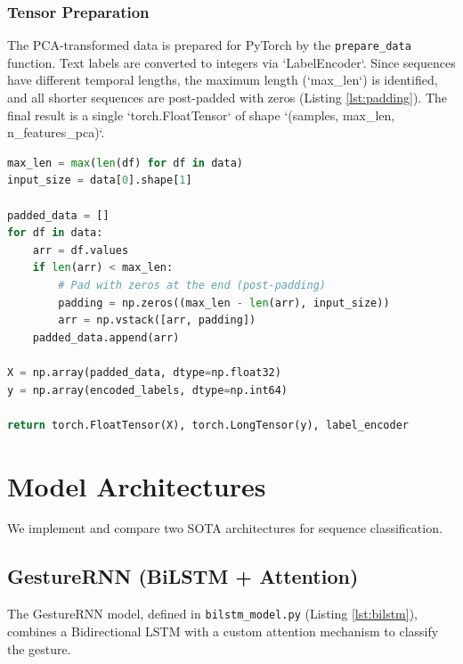 \documentclass[]{IEEEphot}
\begin{document}
\subsubsection{Tensor Preparation}
The PCA-transformed data is prepared for PyTorch by the \texttt{prepare\_data} function. Text labels are converted to integers via `LabelEncoder`. Since sequences have different temporal lengths, the maximum length (`max\_len`) is identified, and all shorter sequences are post-padded with zeros (Listing \ref{lst:padding}). The final result is a single `torch.FloatTensor` of shape `(samples, max\_len, n\_features\_pca)`.

\begin{lstlisting}[language=Python, caption={Padding logic from \texttt{prepare\_data} in \texttt{utils/data\_processing.py}.}, label={lst:padding}, captionpos=t]
max_len = max(len(df) for df in data)
input_size = data[0].shape[1]

padded_data = []
for df in data:
    arr = df.values
    if len(arr) < max_len:
        # Pad with zeros at the end (post-padding)
        padding = np.zeros((max_len - len(arr), input_size))
        arr = np.vstack([arr, padding])
    padded_data.append(arr)
    
X = np.array(padded_data, dtype=np.float32)
y = np.array(encoded_labels, dtype=np.int64)

return torch.FloatTensor(X), torch.LongTensor(y), label_encoder
\end{lstlisting}


\section{Model Architectures}
We implement and compare two SOTA architectures for sequence classification.

\subsection{GestureRNN (BiLSTM + Attention)}
The GestureRNN model, defined in \texttt{bilstm\_model.py} (Listing \ref{lst:bilstm}), combines a Bidirectional LSTM with a custom attention mechanism to classify the gesture.
\end{document}

